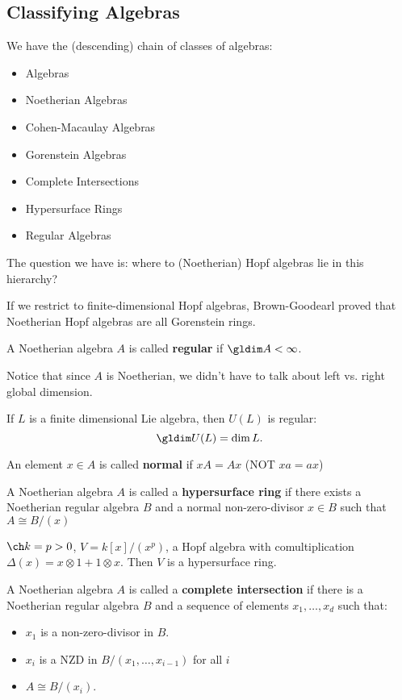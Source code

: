 \documentclass[12pt]{article}
\begin{document}
\subsection{Classifying Algebras}
We have the (descending) chain of classes of algebras:
\begin{itemize}
	\item Algebras
	\item Noetherian Algebras
	\item Cohen-Macaulay Algebras
	\item Gorenstein Algebras
	\item Complete Intersections
	\item Hypersurface Rings
	\item Regular Algebras
\end{itemize}
The question we have is: where to (Noetherian) Hopf algebras lie in this hierarchy?

If we restrict to finite-dimensional Hopf algebras, Brown-Goodearl proved that Noetherian Hopf algebras
are all Gorenstein rings.

\begin{defn}
	A Noetherian algebra $A$ is called \textbf{regular} if $\gldim A<\infty$.
\end{defn}
\begin{rmk}
	Notice that since $A$ is Noetherian, we didn't have to talk about left vs. right global dimension.
\end{rmk}
\begin{ex}
	If $L$ is a finite dimensional Lie algebra, then $U(L)$ is regular:
	\[\gldim U(L)=\dim L.\]
\end{ex}
\begin{defn}
	An element $x\in A$ is called \textbf{normal} if $xA=Ax$ (NOT $xa=ax$)
\end{defn}
\begin{defn}
	A Noetherian algebra $A$ is called a \textbf{hypersurface ring} if there exists a Noetherian 
	regular algebra $B$ and a normal non-zero-divisor $x\in B$ such that $A\cong B/(x)$
\end{defn}
\begin{ex}
	$\ch k=p>0$, $V=k[x]/(x^p)$, a Hopf algebra with comultiplication $\Delta(x)=x\otimes 1+1\otimes x$.
	Then $V$ is a hypersurface ring.
\end{ex}
\begin{defn}
	A Noetherian algebra $A$ is called a \textbf{complete intersection} if there is a Noetherian regular algebra
	$B$ and a sequence of elements $x_1,\dots,x_d$ such that:
	\begin{itemize}
		\item $x_1$ is a non-zero-divisor in $B$.
		\item $x_i$ is a NZD in $B/(x_1,\dots,x_{i-1})$ for all $i$
		\item $A\cong B/(x_i)$.
	\end{itemize}
\end{defn}
\end{document}
